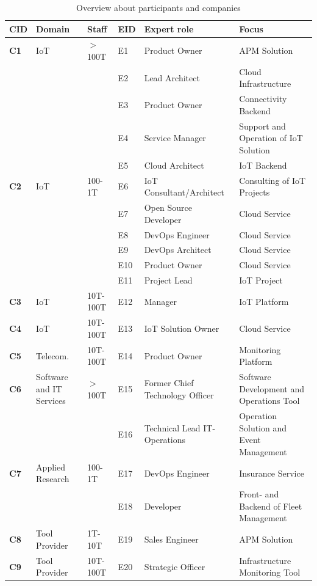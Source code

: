 \documentclass[runningheads]{llncs}
\begin{document}
\begin{table}[t]
\caption{Overview about participants and companies }\label{OverviewParticipantsCompanies}
\scriptsize
\begin{tabular}{
    C{0.6cm}
    L{1.8cm}
    C{1.2cm}
    C{0.6cm}
    L{3.4cm}
    L{3.9cm}
}

\hline
\textbf{CID} &  \textbf{Domain} & \textbf{Staff} & \textbf{EID} & \textbf{Expert role} & \textbf{Focus}\\
\hline

\textbf{C1} &  IoT &\(>\) 100T & E1 & Product Owner & APM Solution\\
&&& E2 & Lead Architect & Cloud Infrastructure\\
&&& E3 & Product Owner & Connectivity Backend\\
&&& E4 & Service Manager & Support and Operation of IoT Solution\\
&&&E5&Cloud Architect&IoT Backend\\
\hline
\textbf{C2}&IoT&100-1T&E6&IoT Consultant/Architect &Consulting of IoT Projects\\
&&&E7&Open Source Developer&Cloud Service \\
&&&E8&DevOps Engineer&Cloud Service\\
&&&E9&DevOps Architect&Cloud Service\\
&&&E10&Product Owner &Cloud Service\\
&&&E11&Project Lead&IoT Project\\
\hline
\textbf{C3}&IoT&10T-100T &E12&Manager & IoT Platform\\
\hline
\textbf{C4}&IoT&10T-100T &E13&IoT Solution Owner &Cloud Service\\
\hline
\textbf{C5}&Telecom.&10T-100T &E14&Product Owner &Monitoring Platform\\
\hline
\textbf{C6}&Software and IT Services&\(>\) 100T &E15&Former Chief Technology Officer& Software Development and Operations Tool\\
&&&E16&Technical Lead IT-Operations& Operation Solution and Event Management\\
\hline
\textbf{C7}&Applied Research&100-1T &E17&DevOps Engineer&Insurance Service\\
& & & E18&Developer&Front- and Backend of Fleet Management\\
\hline
\textbf{C8}&Tool Provider&1T-10T &E19&Sales Engineer&APM Solution\\
\hline
\textbf{C9}&Tool Provider &10T-100T &E20&Strategic Officer&Infrastructure Monitoring Tool\\

\end{tabular}
\end{table}
\end{document}
